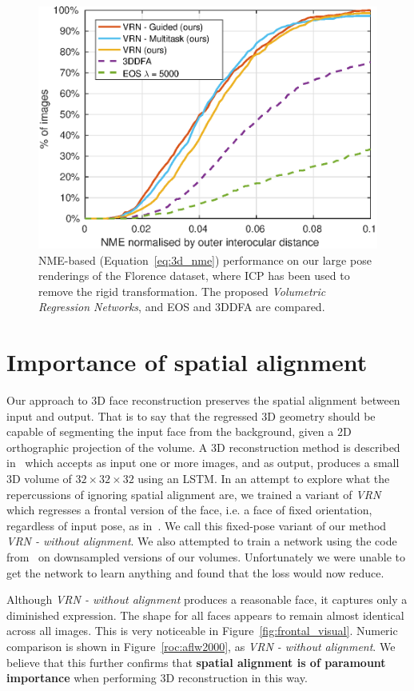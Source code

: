 \begin{figure}
  \centering
  \includegraphics[width=0.75\linewidth]{curves-icp/florence.eps}
  \caption[NME performance on Florence with ICP Alignment]{NME-based
    (Equation~\ref{eq:3d_nme}) performance on our large pose
    renderings of the Florence dataset, where ICP has been used to
    remove the rigid transformation. The proposed \textit{Volumetric
      Regression Networks}, and EOS and 3DDFA are compared.}
  \label{roc:florenceicp}
\end{figure}


\section{Importance of spatial alignment}
\label{sec:spatialimportance}

Our approach to 3D face reconstruction preserves the spatial alignment
between input and output. That is to say that the regressed 3D
geometry should be capable of segmenting the input face from the
background, given a 2D orthographic projection of the volume. A 3D
reconstruction method is described in~\cite{choy20163d} which accepts
as input one or more images, and as output, produces a small 3D volume
of $32 \times 32 \times 32$ using an LSTM. In an attempt to explore
what the repercussions of ignoring spatial alignment are, we trained a
variant of \textit{VRN} which regresses a frontal version of the face,
i.e. a face of fixed orientation, regardless of input pose, as
in~\cite{choy20163d}. We call this fixed-pose variant of our method
\textit{VRN - without alignment}. We also attempted to train a network
using the code from~\cite{choy20163d} on downsampled versions of our
volumes. Unfortunately we were unable to get the network to learn
anything and found that the loss would now reduce.

Although \textit{VRN - without alignment} produces a reasonable face,
it captures only a diminished expression. The shape for all faces
appears to remain almost identical across all images. This is very
noticeable in Figure~\ref{fig:frontal_visual}. Numeric comparison is
shown in Figure~\ref{roc:aflw2000}, as \textit{VRN - without
  alignment}. We believe that this further confirms that
\textbf{spatial alignment is of paramount importance} when performing
3D reconstruction in this way.

